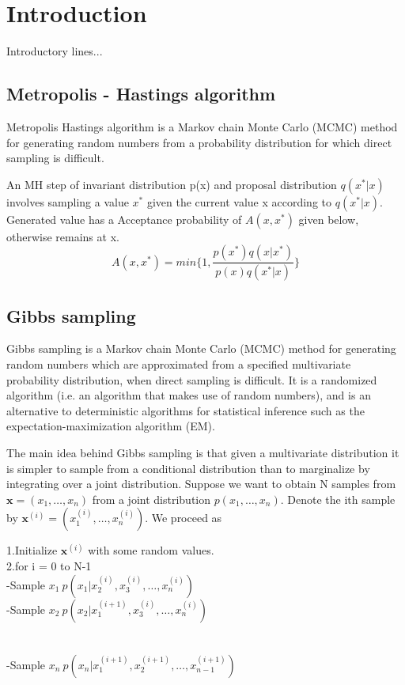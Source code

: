 \chapter{Introduction}

Introductory lines...



\section{Metropolis - Hastings algorithm}

 Metropolis Hastings algorithm is a Markov chain Monte Carlo (MCMC) method for generating random numbers from a probability distribution for which direct sampling is difficult.
 
 An MH step of invariant distribution p(x) and proposal distribution $ q(x^{\ast}|x) $ involves sampling a value $ x^{\ast} $ given the current value x according to $ q(x^{\ast} | x) $. Generated value has a Acceptance probability of
 $ A(x,x^{\ast})$ given below, otherwise remains at x.
$$ A(x,x^{\ast}) = min\{1,\frac{p(x^\ast)q(x|x^{\ast})}{p(x)q(x^{\ast}|x)}\} $$

 

\section{Gibbs sampling}

Gibbs sampling is a Markov chain Monte Carlo (MCMC) method for generating random numbers which are approximated from a specified multivariate probability distribution, when direct sampling is difficult. It is a randomized algorithm (i.e. an algorithm that makes use of random numbers), and is an alternative to deterministic algorithms for statistical inference such as the expectation-maximization algorithm (EM).

The main idea behind Gibbs sampling is that given a multivariate distribution it is simpler to sample from a conditional distribution than to marginalize by integrating over a joint distribution. Suppose we want to obtain N samples from $ \mathbf{x} = (x_1, \dots, x_n) $ from a joint distribution $ p(x_1, \dots, x_n) $. Denote the ith sample by $ \mathbf{x}^{(i)} = (x_1^{(i)}, \dots, x_n^{(i)})$. We proceed as

\begin{enumerate}
1.Initialize $ \mathbf{x}^{(i)} $ with some random values.\\
2.for i = 0 to N-1 \\
-Sample $x_1 ~ p(x_1|x_2^{(i)},x_{3}^{(i)},\dots,x_n^{(i)}) $\\
-Sample $x_2 ~ p(x_2|x_1^{(i+1)},x_{3}^{(i)},\dots,x_n^{(i)}) $\\
    \\
    \\
-Sample $x_n ~ p(x_n|x_1^{(i+1)},x_{2}^{(i+1)},\dots,x_{n-1}^{(i+1)}) $ \\

\end{enumerate}


